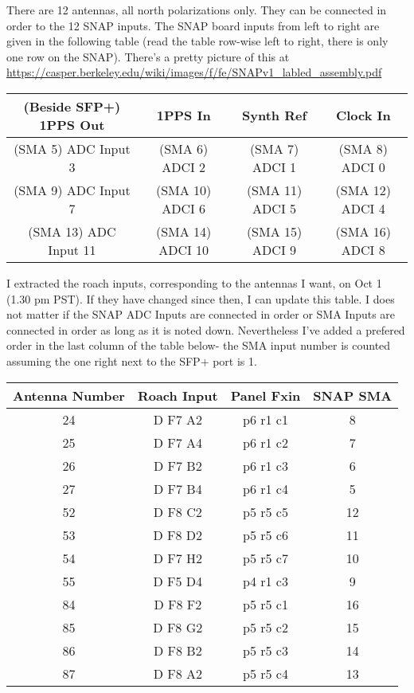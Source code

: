 \documentclass[12pt,usletter,english]{article}
\begin{document}
There are 12 antennas, all north polarizations only. They can be
connected in order to the 12 SNAP inputs. The SNAP board inputs from
left to right are given in the following table (read the table
row-wise left to right, there is only one row on the SNAP). There's a pretty picture of this at 
\url{https://casper.berkeley.edu/wiki/images/f/fe/SNAPv1_labled_assembly.pdf}

\begin{center}
\begin{tabular}{|c|c|c|c|}
  \hline
  (Beside SFP+) 1PPS Out   & 1PPS In       & Synth Ref       & Clock In        \\ \hline
  (SMA 5)  ADC Input 3  & (SMA 6) ADCI 2   & (SMA 7) ADCI 1  & (SMA 8) ADCI 0  \\ \hline
  (SMA 9)  ADC Input 7  & (SMA 10) ADCI 6  & (SMA 11) ADCI 5 & (SMA 12) ADCI 4 \\ \hline
  (SMA 13) ADC Input 11 & (SMA 14) ADCI 10 & (SMA 15) ADCI 9 & (SMA 16) ADCI 8 \\ \hline
\end{tabular}
\end{center}

I extracted the roach inputs, corresponding to the antennas I want, on
Oct 1 (1.30 pm PST). If they have changed since then, I can update
this table. I does not matter if the SNAP ADC Inputs are connected in
order or SMA Inputs are connected in order as long as it is noted
down. Nevertheless I've added a prefered order in the last column of
the table below- the SMA input number is counted assuming the one
right next to the SFP+ port is 1.

\begin{center}
\begin{tabular}{|c|c|c|c|}
  \hline
  Antenna Number & Roach Input & Panel Fxin & SNAP SMA \\
  \hline
  24   &   D F7 A2   &  p6 r1 c1  & 8  \\  \hline
  25   &   D F7 A4   &  p6 r1 c2  & 7  \\  \hline
  26   &   D F7 B2   &  p6 r1 c3  & 6  \\  \hline
  27   &   D F7 B4   &  p6 r1 c4  & 5  \\  \hline
  52   &   D F8 C2   &  p5 r5 c5  & 12 \\  \hline
  53   &   D F8 D2   &  p5 r5 c6  & 11 \\  \hline
  54   &   D F7 H2   &  p5 r5 c7  & 10 \\  \hline
  55   &   D F5 D4   &  p4 r1 c3  & 9  \\  \hline
  84   &   D F8 F2   &  p5 r5 c1  & 16 \\  \hline
  85   &   D F8 G2   &  p5 r5 c2  & 15 \\  \hline
  86   &   D F8 B2   &  p5 r5 c3  & 14 \\  \hline
  87   &   D F8 A2   &  p5 r5 c4  & 13 \\  \hline
\end{tabular}
\end{center}
\end{document}
